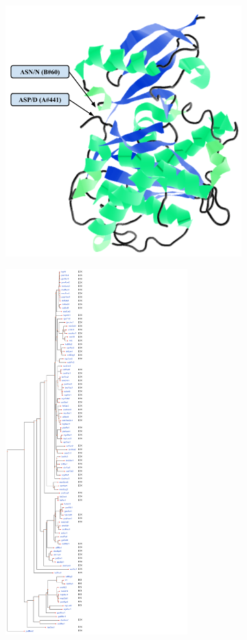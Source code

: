 \begin{figure}
\centering
\begin{subfigure}{.9\textwidth}
  \centering
  \includegraphics[width=14cm]{figs/gwas_figure_4_jmol.png}
  \label{fig:sub1}
\end{subfigure}%
\begin{subfigure}{.1\textwidth}
  \centering
  \includegraphics[width=7cm]{figs/gwas_figure_4_tree_coevolution.png}

\end{subfigure}
\end{figure}

